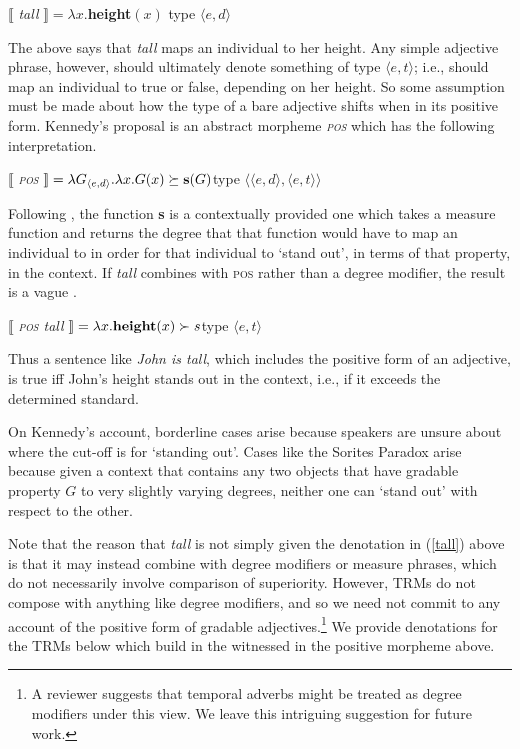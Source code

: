 \documentclass[output=paper,
modfonts
]{langscibook}
\begin{document}
\ea
$\llbracket$ {\it tall} $\rrbracket = \lambda x.${\bf height}$(x)$  \hfill type $\langle e, d\rangle$
\z

The above says that \textit{tall} maps an individual to her height.
Any simple adjective phrase, however, should ultimately denote something of type $\langle e, t\rangle$; i.e., should map an individual to true or false, depending on her height.
So some assumption must be made about how the type of a bare adjective shifts when in its positive form.
Kennedy's proposal is an abstract morpheme \textit{\textsc{pos}} which has the following interpretation.

\ea
$\llbracket$ {\it \textsc{pos}} $\rrbracket = \lambda G_{\langle e, d\rangle}.\lambda x. G(x) \succeq \textbf{s}(G)  \hfill $type $\langle\langle e, d\rangle,\langle e,t \rangle\rangle$
\z

Following \citet{kennedy07vagueness}, the function \textbf{s} is a contextually provided one which takes a measure function and returns the degree that that function would have to map an individual to in order for that individual to `stand out', in terms of that property, in the context.
If \textit{tall} combines with \textsc{pos} rather than a degree modifier, the result is a vague .

\ea
\label{tall} $\llbracket$ {\it \textsc{pos} tall} $\rrbracket = \lambda x. \textbf{height}(x) \succ s  \hfill $type $\langle e,t \rangle$
\z

Thus a sentence like \textit{John is tall}, which includes the positive form of an adjective, is true iff John's height stands out in the context, i.e., if it exceeds the determined standard.

On Kennedy's account, borderline cases arise because speakers are unsure about where the cut-off is for `standing out'.
Cases like the Sorites Paradox arise because given a context that contains any two objects that have gradable property $G$ to very slightly varying degrees, neither one can `stand out' with respect to the other. 

Note that the reason that \textit{tall} is not simply given the denotation in (\ref{tall}) above is that it may instead combine with degree modifiers or measure phrases, which do not
necessarily involve comparison of superiority.
However,  TRMs do not compose with anything like degree modifiers, and so we need not commit to any account of the positive form of gradable adjectives.\footnote{A reviewer suggests that temporal adverbs might be treated as degree modifiers under this view. We leave this intriguing suggestion for future work.}
We provide denotations for the  TRMs below which build in the  witnessed in the positive morpheme above.
\end{document}
